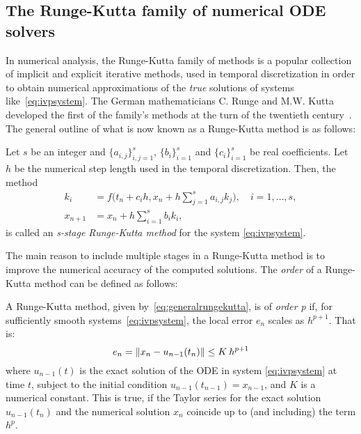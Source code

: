 \subsection{The Runge-Kutta family of numerical ODE solvers}
\label{sub:the_runge_kutta_family_of_numerical_ode_solvers}

In numerical analysis, the Runge-Kutta family of methods is a popular collection
of implicit and explicit iterative methods, used in temporal discretization in
order to obtain numerical approximations of the \emph{true} solutions of systems
like~\eqref{eq:ivpsystem}. The German mathematicians C. Runge and M.W. Kutta
developed the first of the family's methods at the turn of the twentieth
century~\parencite[p.134]{hairer1993solving}. The general outline of what
is now known as a Runge-Kutta method is as follows:

\begin{defn}
    \label{def:runge_kutta_methods}
    Let $s$ be an integer and $\{a_{i,j}\}_{i,j=1}^{s}$, %
    $\{b_{i}\}_{i=1}^{s}$ and $\{c_{i}\}_{i=1}^{s}$ be real coefficients.\hfill\newline
    Let $h$ be the numerical step length used in the temporal discretization.\hfill\newline
    Then, the method
    \begin{equation}
        \label{eq:generalrungekutta}
        \begin{aligned}
        k_{i} &= f\bigg(t_{n} + c_{i}h, x_{n} + h\sum\limits_{j=1}^{s}a_{i,j}k_{j}\bigg), \quad{}i=1,\ldots,s,\\
        x_{n+1} &= x_{n} + h\sum\limits_{i=1}^{s}b_{i}k_{i},
        \end{aligned}
    \end{equation}
    is called an \emph{s-stage Runge-Kutta method} for the system
    \eqref{eq:ivpsystem}.
\end{defn}

The main reason to include multiple stages in a Runge-Kutta method is to
improve the numerical accuracy of the computed solutions. The \emph{order} of a
Runge-Kutta method can be defined as follows:

\begin{defn}
    \label{def:runge_kutta_order}
    A Runge-Kutta method, given by~\cref{eq:generalrungekutta}, is of
    \emph{order p} if, for sufficiently smooth systems~\eqref{eq:ivpsystem},
    the local error $e_{n}$ scales as $h^{p+1}$. That is:
    \begin{equation}
        \label{eq:rungekuttaorder}
        e_{n} = \norm{x_{n}-u_{n-1}(t_{n})} \leq K\hspace{0.5ex}h^{p+1}
    \end{equation}
    where $u_{n-1}(t)$ is the exact solution of the ODE in system
    \eqref{eq:ivpsystem} at time $t$, subject to the initial condition
    $u_{n-1}(t_{n-1}) = x_{n-1}$, and $K$ is a numerical constant. This is true,
    if the Taylor series for the exact solution $u_{n-1}(t_{n})$ and the
    numerical solution $x_{n}$ coincide up to (and including) the term $h^{p}$.
\end{defn}

